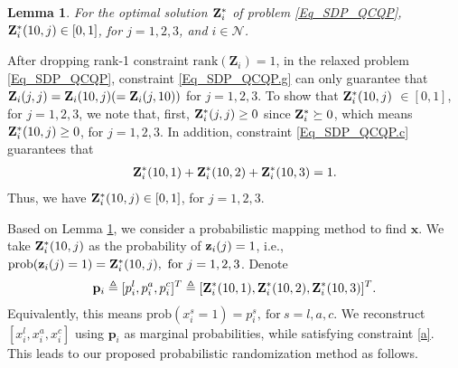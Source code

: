 \documentclass[10pt,journal,compsoc]{IEEEtran}
\newtheorem{Lem}{Lemma}
\def\zbf{{\bf z}}
\def\Zbf{{\bf Z}}
\begin{document}
{\begin{Lem}\label{lem.random}\it
For the optimal solution $\Zbf^*_i$ of problem \eqref{Eq_SDP_QCQP},
$\Zbf^*_i(10,j) \in [0,1]$, for $j=1,2,3$, and $i\in \mathcal{N}$.
\end{Lem}
\begin{IEEEproof}
After dropping rank-1 constraint $\textrm{rank}(\mathbf{Z}_i)=1$, in
the relaxed problem \eqref{Eq_SDP_QCQP}, constraint
\eqref{Eq_SDP_QCQP.g}
 can only guarantee that $\Zbf_i(j,j)=\Zbf_i(10,j)(=\Zbf_i(j,10))$ for
 $j=1,2,3$. To show that $\Zbf^*_i(10,j)$ $\in [0,1]$, for $j=1,2,3$, we note that, first, $\Zbf_i^*(j,j)\geq 0$
since $\Zbf_i^*\succeq 0$, which means $\Zbf^*_i(10,j)\geq 0$, for
$j=1,2,3$. In addition, constraint \eqref{Eq_SDP_QCQP.c} guarantees
that
\begin{align}
\Zbf^*_i(10,1)+\Zbf^*_i(10,2)+\Zbf^*_i(10,3)=1.\nonumber\allowdisplaybreaks
\end{align}
Thus, we have $\Zbf^*_i(10,j)\in [0,1]$, for $j=1,2,3$.
\end{IEEEproof}

Based on Lemma \ref{lem.random}, we consider a probabilistic mapping
method to find $\mathbf{x}$. We take $\Zbf^*_i(10,j)$ as the
probability of $\zbf_i(j)=1$, i.e.,
$\mathrm{prob}(\zbf_i(j)=1)=\Zbf^*_i(10,j),\ \mathrm{for}\ j=1,2,3$.
Denote
\begin{align}
\mathbf{p}_{i} \triangleq [p^l_{i}, p^a_{i}, p^c_{i}]^T\triangleq
[\Zbf_i^*(10,1),\Zbf_i^*(10,2),\Zbf_i^*(10,3)]^T.\nonumber\allowdisplaybreaks
\end{align}
Equivalently, this means $\mathrm{prob}(x_i^s=1)=p_i^s,\
\mathrm{for}\ s=l,a,c$. We reconstruct $[x_i^l,x_i^a,x_i^c]$ using
$\mathbf{p}_i$ as marginal probabilities,
 while satisfying
constraint \eqref{a}. This leads to our proposed probabilistic
randomization method as follows.

}
\end{document}
